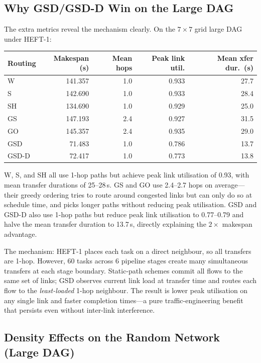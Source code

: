 \documentclass[11pt]{article}
\begin{document}
\subsection{Why GSD/GSD-D Win on the Large DAG}

The extra metrics reveal the mechanism clearly. On the $7\times7$ grid large DAG under HEFT-1:

\begin{center}
\small
\begin{tabular}{l r r r r}
\toprule
\textbf{Routing} & \textbf{Makespan (s)} & \textbf{Mean hops} & \textbf{Peak link util.} & \textbf{Mean xfer dur.\ (s)} \\
\midrule
  W & 141.357 & 1.0 & 0.933 & 27.7 \\
  S & 142.690 & 1.0 & 0.933 & 28.4 \\
  SH & 134.690 & 1.0 & 0.929 & 25.0 \\
  GS & 147.193 & 2.4 & 0.927 & 31.5 \\
  GO & 145.357 & 2.4 & 0.935 & 29.0 \\
  GSD & 71.483 & 1.0 & 0.786 & 13.7 \\
  GSD-D & 72.417 & 1.0 & 0.773 & 13.8 \\
\bottomrule
\end{tabular}
\end{center}

W, S, and SH all use 1-hop paths but achieve peak link utilisation of 0.93, with mean transfer durations of 25--28\,s. GS and GO use 2.4--2.7 hops on average---their greedy ordering tries to route around congested links but can only do so at schedule time, and picks longer paths without reducing peak utilisation. GSD and GSD-D also use 1-hop paths but reduce peak link utilisation to 0.77--0.79 and halve the mean transfer duration to 13.7\,s, directly explaining the $2\times$ makespan advantage.

The mechanism: HEFT-1 places each task on a direct neighbour, so all transfers are 1-hop. However, 60 tasks across 6 pipeline stages create many simultaneous transfers at each stage boundary. Static-path schemes commit all flows to the same set of links; GSD observes current link load at transfer time and routes each flow to the \emph{least-loaded} 1-hop neighbour. The result is lower peak utilisation on any single link and faster completion times---a pure traffic-engineering benefit that persists even without inter-link interference.

\subsection{Density Effects on the Random Network (Large DAG)}
\end{document}
